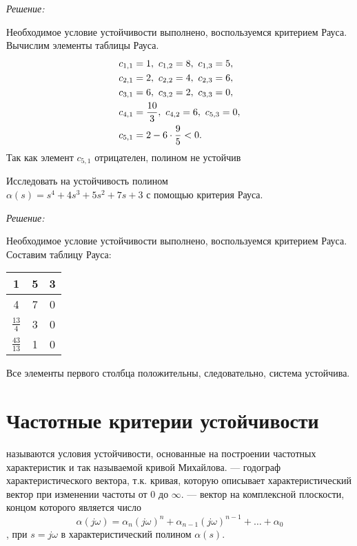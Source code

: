 \documentclass[../../TAU.tex]{subfiles}
\begin{document}
    {\it Решение:}\par
    Необходимое условие устойчивости выполнено, воспользуемся критерием Рауса. Вычислим элементы таблицы Рауса.
    \begin{align*}
        c_{1,1}& = 1,\ c_{1,2} = 8,\ c_{1,3} = 5, \\
        c_{2,1}& = 2,\ c_{2,2} = 4,\ c_{2,3} = 6, \\
        c_{3,1}& = 6,\ c_{3,2} = 2,\ c_{3,3} = 0, \\
        c_{4,1}& = {10\over3},\ c_{4,2} = 6,\ c_{5,3} = 0, \\
        c_{5,1}& = 2-6\cdot{9\over5} < 0.
    \end{align*}
    Так как элемент $c_{5,1}$ отрицателен, полином не устойчив 


    \examp Исследовать на устойчивость полином\\
    $\alpha(s) = s^4+4s^3+5s^2+7s+3$ 
    с помощью критерия Рауса.

    {\it Решение:}\par
    Необходимое условие устойчивости выполнено, воспользуемся критерием Рауса. Составим таблицу Рауса:
    \begin{center}
        \begin{tabular}[h]{|c|c|c|}
            \hline
            1 & 5 & 3 \\
            \hline
            4 & 7 & 0 \\
            \hline
            $\frac{13}{4}$ & 3 & 0 \\
            \hline
            $\frac{43}{13}$ & 1 & 0 \\
            \hline
        \end{tabular}
    \end{center}
    Все элементы первого столбца положительны, следовательно, система устойчива.

\section{Частотные критерии устойчивости}

     называются условия устойчивости, основанные на построении частотных характеристик и так называемой кривой Михайлова.
     --- годограф характеристического вектора, т.к. кривая, которую описывает характеристический вектор при изменении частоты от $0$ до $\infty$.
     --- вектор на комплексной плоскости, концом которого является число 
    $$\alpha(j \omega)=\alpha_n(j \omega)^n+\alpha_{n-1}(j \omega)^{n-1}+\dots+\alpha_0$$, при $s=j \omega$ в характеристический полином $\alpha(s)$.
\end{document}
